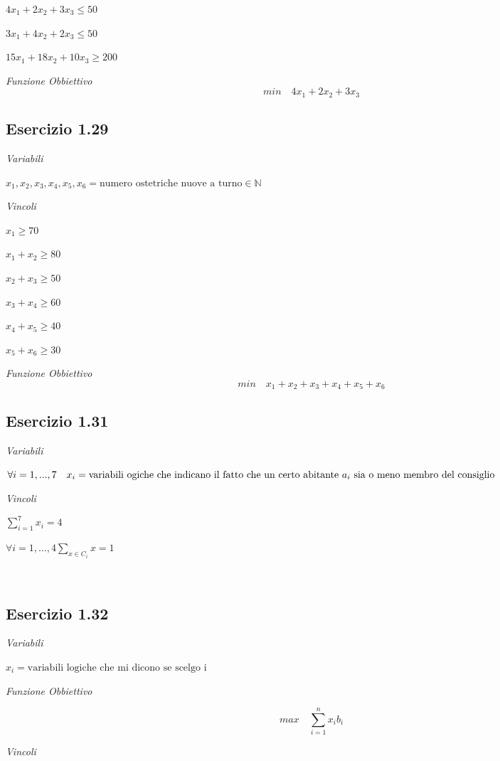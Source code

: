 $ 4x_1 + 2x_2 + 3x_3 \leq 50$

$ 3x_1 + 4 x_2 + 2x_3 \leq 50 $

$ 15 x_1 + 18 x_2 + 10 x_3 \geq 200 $

\textit{Funzione Obbiettivo}
\[
min \quad 4x_1 + 2 x_2 + 3 x_3
\]

\subsection{Esercizio 1.29}

\textit{Variabili}

$ x_1, x_2, x_3, x_4,x_5, x_6 = \text{numero ostetriche nuove a turno} \in \mathbb{N} $

\textit{Vincoli}

$ x_1 \geq 70 $

$ x_1 + x_2 \geq 80 $

$ x_2 + x_3 \geq 50 $

$ x_3 + x_4 \geq 60 $

$ x_4 + x_5 \geq 40 $

$ x_5 + x_6 \geq 30 $

\textit{Funzione Obbiettivo}
\[
min \quad x_1 + x_2 + x_3 +x_4 +x_5 +x_6
\]

\subsection{Esercizio 1.31}

\textit{Variabili}

$ \forall i = 1,...,7 \quad x_i = \text{variabili ogiche che indicano il fatto che un certo abitante $ a_i $ sia o meno membro del consiglio} $

\textit{Vincoli}

$ \sum_{i=1}^{7} x_i = 4 $

$ \forall i = 1,...,4 \sum_{x \in C_i} x = 1  $

$  $

\subsection{Esercizio 1.32}

\textit{Variabili}

$ x_i = \text{variabili logiche che mi dicono se scelgo i} $

\textit{Funzione Obbiettivo}

\[
max \quad \sum_{i=1}^{n} x_ib_i
\]

\textit{Vincoli}

